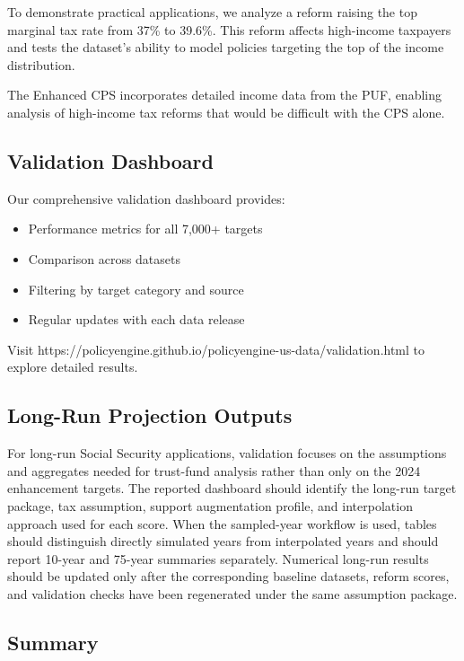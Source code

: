 To demonstrate practical applications, we analyze a reform raising the top marginal tax rate from 37\% to 39.6\%. This reform affects high-income taxpayers and tests the dataset's ability to model policies targeting the top of the income distribution.

The Enhanced CPS incorporates detailed income data from the PUF, enabling analysis of high-income tax reforms that would be difficult with the CPS alone.

\subsection{Validation Dashboard}

Our comprehensive validation dashboard provides:
\begin{itemize}
\item Performance metrics for all 7,000+ targets
\item Comparison across datasets
\item Filtering by target category and source
\item Regular updates with each data release
\end{itemize}

Visit https://policyengine.github.io/policyengine-us-data/validation.html to explore detailed results.

\subsection{Long-Run Projection Outputs}

For long-run Social Security applications, validation focuses on the assumptions and aggregates needed for trust-fund analysis rather than only on the 2024 enhancement targets. The reported dashboard should identify the long-run target package, tax assumption, support augmentation profile, and interpolation approach used for each score. When the sampled-year workflow is used, tables should distinguish directly simulated years from interpolated years and should report 10-year and 75-year summaries separately. Numerical long-run results should be updated only after the corresponding baseline datasets, reform scores, and validation checks have been regenerated under the same assumption package.

\subsection{Summary}


